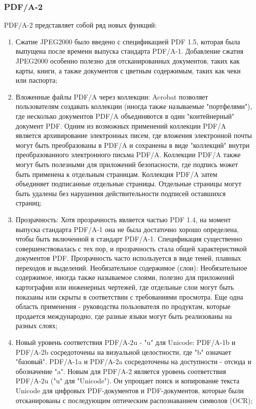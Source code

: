 \subsubsection{PDF/A-2}
PDF/A-2 представляет собой ряд новых функций:
\begin{enumerate}
\item Сжатие JPEG2000 было введено с спецификацией PDF 1.5, которая была выпущена после времени выпуска стандарта PDF/A-1. Добавление сжатия JPEG2000 особенно полезно для отсканированных документов, таких как карты, книги, а также документов с цветным содержимым, таких как чеки или паспорта;
\item Вложенные файлы PDF/A через коллекции: Acrobat позволяет пользователям создавать коллекции (иногда также называемые "портфелями"), где несколько документов PDF/A объединяются в один "контейнерный" документ PDF. Одним из возможных применений коллекции PDF/A является архивирование электронных писем, где вложения электронной почты могут быть преобразованы в PDF/A и сохранены в виде "коллекций" внутри преобразованного электронного письма PDF/A. Коллекции PDF/A также могут быть полезными для приложений безопасности, где подпись может быть применена к отдельным страницам. Коллекция PDF/A затем объединяет подписанные отдельные страницы. Отдельные страницы могут быть удалены без нарушения действительности подписей оставшихся страниц;
\item Прозрачность: Хотя прозрачность является частью PDF 1.4, на момент выпуска стандарта PDF/A-1 она не была достаточно хорошо определена, чтобы быть включенной в стандарт PDF/A-1. Спецификация существенно совершенствовалась с тех пор, и прозрачность стала общей характеристикой документов PDF. Прозрачность часто используется в виде теней, плавных переходов и выделений.
Необязательное содержимое (слои): Необязательное содержимое, иногда также называемое слоями, полезно для приложений картографии или инженерных чертежей, где отдельные слои могут быть показаны или скрыты в соответствии с требованиями просмотра. Еще одна область применения - руководства пользователя по продуктам, которые продается международно, где разные языки могут быть реализованы на разных слоях;
\item Новый уровень соответствия PDF/A-2u - "u" для Unicode: PDF/A-1b и PDF/A-2b сосредоточены на визуальной целостности, где "b" означает "базовый". PDF/A-1a и PDF/A-2a сосредоточены на доступности - отсюда и обозначение "a". Новым для PDF/A-2 является уровень соответствия PDF/A-2u ("u" для "Unicode"). Он упрощает поиск и копирование текста Unicode для цифровых PDF-документов и PDF-документов, которые были отсканированы с последующим оптическим распознаванием символов (OCR);

\end{enumerate}
